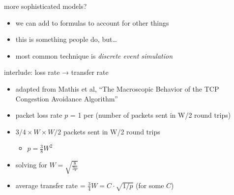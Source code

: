 \begin{frame}{more sophisticated models?}
    \begin{itemize}
    \item we can add to formulas to account for other things
    \item this is something people do, but\ldots
    \vspace{.5cm}
    \item most common technique is \textit{discrete event simulation}
    \end{itemize}
\end{frame}

\begin{frame}{interlude: loss rate → transfer rate}
    \begin{itemize}
        \item {\scriptsize adapted from Mathis et al, ``The Macroscopic Behavior of the TCP Congestion Avoidance Algorithm''}
    \item packet loss rate $p$ = 1 per (number of packets sent in W/2 round trips)
    \item $3/4 \times W \times W/2$ packets sent in W/2 round trips
        \begin{itemize}
        \item $p=\frac{3}{8}W^2$
        \end{itemize}
    \item solving for $W = \sqrt{\frac{8}{3p}}$
    \item average transfer rate = $\frac{3}{4}W=C \cdot \sqrt{1/p}$ (for some $C$)
    \end{itemize}
\end{frame}
